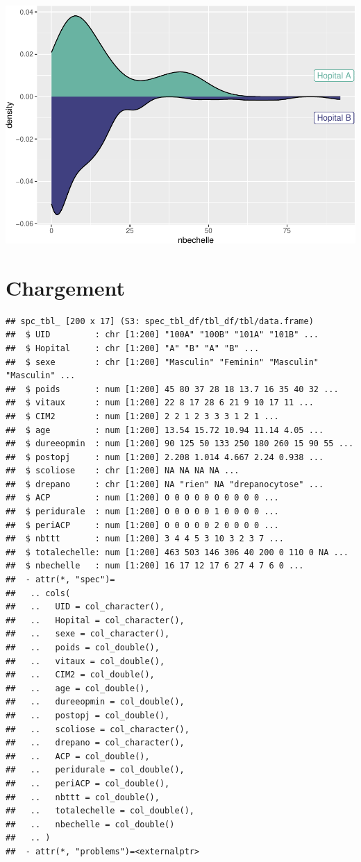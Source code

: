 \documentclass[
]{book}
\begin{document}
\includegraphics{_main_files/figure-latex/unnamed-chunk-80-1.pdf}

\section{Chargement}\label{chargement}

\begin{verbatim}
## spc_tbl_ [200 x 17] (S3: spec_tbl_df/tbl_df/tbl/data.frame)
##  $ UID         : chr [1:200] "100A" "100B" "101A" "101B" ...
##  $ Hopital     : chr [1:200] "A" "B" "A" "B" ...
##  $ sexe        : chr [1:200] "Masculin" "Feminin" "Masculin" "Masculin" ...
##  $ poids       : num [1:200] 45 80 37 28 18 13.7 16 35 40 32 ...
##  $ vitaux      : num [1:200] 22 8 17 28 6 21 9 10 17 11 ...
##  $ CIM2        : num [1:200] 2 2 1 2 3 3 3 1 2 1 ...
##  $ age         : num [1:200] 13.54 15.72 10.94 11.14 4.05 ...
##  $ dureeopmin  : num [1:200] 90 125 50 133 250 180 260 15 90 55 ...
##  $ postopj     : num [1:200] 2.208 1.014 4.667 2.24 0.938 ...
##  $ scoliose    : chr [1:200] NA NA NA NA ...
##  $ drepano     : chr [1:200] NA "rien" NA "drepanocytose" ...
##  $ ACP         : num [1:200] 0 0 0 0 0 0 0 0 0 0 ...
##  $ peridurale  : num [1:200] 0 0 0 0 0 1 0 0 0 0 ...
##  $ periACP     : num [1:200] 0 0 0 0 0 2 0 0 0 0 ...
##  $ nbttt       : num [1:200] 3 4 4 5 3 10 3 2 3 7 ...
##  $ totalechelle: num [1:200] 463 503 146 306 40 200 0 110 0 NA ...
##  $ nbechelle   : num [1:200] 16 17 12 17 6 27 4 7 6 0 ...
##  - attr(*, "spec")=
##   .. cols(
##   ..   UID = col_character(),
##   ..   Hopital = col_character(),
##   ..   sexe = col_character(),
##   ..   poids = col_double(),
##   ..   vitaux = col_double(),
##   ..   CIM2 = col_double(),
##   ..   age = col_double(),
##   ..   dureeopmin = col_double(),
##   ..   postopj = col_double(),
##   ..   scoliose = col_character(),
##   ..   drepano = col_character(),
##   ..   ACP = col_double(),
##   ..   peridurale = col_double(),
##   ..   periACP = col_double(),
##   ..   nbttt = col_double(),
##   ..   totalechelle = col_double(),
##   ..   nbechelle = col_double()
##   .. )
##  - attr(*, "problems")=<externalptr>
\end{verbatim}
\end{document}
